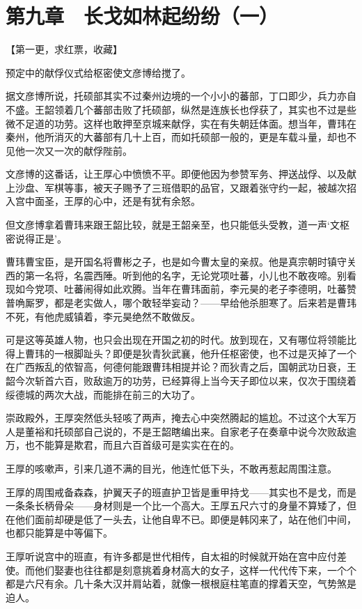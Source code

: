 \section{第九章　长戈如林起纷纷（一）}

【第一更，求红票，收藏】

预定中的献俘仪式给枢密使文彦博给搅了。

据文彦博所说，托硕部其实不过秦州边境的一个小小的蕃部，丁口即少，兵力亦自不盛。王韶领着几个蕃部击败了托硕部，纵然是连族长也俘获了，其实也不过是些微不足道的功劳。这样也敢押至京城来献俘，实在有失朝廷体面。想当年，曹玮在秦州，他所消灭的大蕃部有几十上百，而如托硕部一般的，更是车载斗量，却也不见他一次又一次的献俘陛前。

文彦博的这番话，让王厚心中愤愤不平。即便他因为参赞军务、押送战俘、以及献上沙盘、军棋等事，被天子赐予了三班借职的品官，又跟着张守约一起，被越次招入宫中面圣，王厚的心中，还是有犹有余怒。

但文彦博拿着曹玮来跟王韶比较，就是王韶亲至，也只能低头受教，道一声‘文枢密说得正是’。

曹玮曹宝臣，是开国名将曹彬之子，也是如今曹太皇的亲叔。他是真宗朝时镇守关西的第一名将，名震西陲。听到他的名字，无论党项吐蕃，小儿也不敢夜啼。别看现如今党项、吐蕃闹得如此欢腾。当年在曹玮面前，李元昊的老子李德明，吐蕃赞普唃厮罗，都是老实做人，哪个敢轻举妄动？——早给他杀胆寒了。后来若是曹玮不死，有他虎威镇着，李元昊绝然不敢做反。

可是这等英雄人物，也只会出现在开国之初的时代。放到现在，又有哪位将领能比得上曹玮的一根脚趾头？即便是狄青狄武襄，他升任枢密使，也不过是灭掉了一个在广西叛乱的侬智高，何德何能跟曹玮相提并论？而狄青之后，国朝武功日衰，王韶今次斩首六百，败敌逾万的功劳，已经算得上当今天子即位以来，仅次于围绕着绥德城的两次大战，而能排在前三的大功了。

崇政殿外，王厚突然低头轻咳了两声，掩去心中突然腾起的尴尬。不过这个大军万人是董裕和托硕部自己说的，不是王韶瞎编出来。自家老子在奏章中说今次败敌逾万，也不能算是欺君，而且六百首级可是实实在在的。

王厚的咳嗽声，引来几道不满的目光，他连忙低下头，不敢再惹起周围注意。

王厚的周围戒备森森，护翼天子的班直护卫皆是重甲持戈——其实也不是戈，而是一条条长柄骨朵——身材则是一个比一个高大。王厚五尺六寸的身量不算矮了，但在他们面前却硬是低了一头去，让他自卑不已。即便是韩冈来了，站在他们中间，也都只能算是中等偏下。

王厚听说宫中的班直，有许多都是世代相传，自太祖的时候就开始在宫中应付差使。而他们娶妻也往往都是刻意挑着身材高大的女子，这样一代代传下来，一个个都是六尺有余。几十条大汉并肩站着，就像一根根庭柱笔直的撑着天空，气势煞是迫人。

